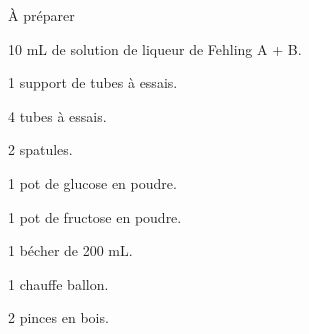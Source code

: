 


\begin{boiteMateriel}{À préparer}
  \begin{protocole}
    \item 10 mL de solution de liqueur de Fehling A + B.
    \item 1 support de tubes à essais.
    \item 4 tubes à essais.
    \item 2 spatules.
    \item 1 pot de glucose en poudre.
    \item 1 pot de fructose en poudre.
    \item 1 bécher de 200 mL.
    \item 1 chauffe ballon.
    \item 2 pinces en bois.
  \end{protocole}
\end{boiteMateriel}